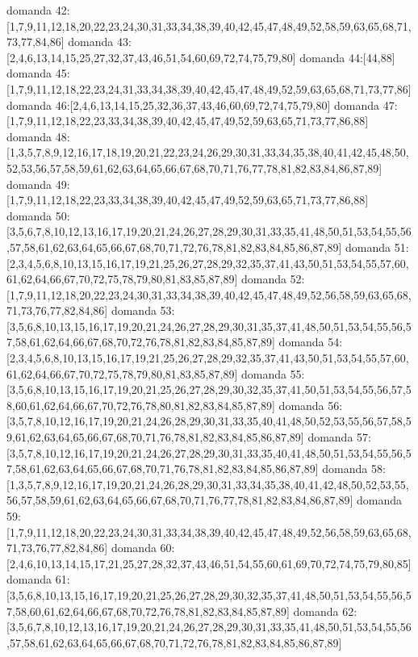domanda 42:[1,7,9,11,12,18,20,22,23,24,30,31,33,34,38,39,40,42,45,47,48,49,52,58,59,63,65,68,71,73,77,84,86]
domanda 43:[2,4,6,13,14,15,25,27,32,37,43,46,51,54,60,69,72,74,75,79,80]
domanda 44:[44,88]
domanda 45:[1,7,9,11,12,18,22,23,24,31,33,34,38,39,40,42,45,47,48,49,52,59,63,65,68,71,73,77,86]
domanda 46:[2,4,6,13,14,15,25,32,36,37,43,46,60,69,72,74,75,79,80]
domanda 47:[1,7,9,11,12,18,22,23,33,34,38,39,40,42,45,47,49,52,59,63,65,71,73,77,86,88]
domanda 48:[1,3,5,7,8,9,12,16,17,18,19,20,21,22,23,24,26,29,30,31,33,34,35,38,40,41,42,45,48,50,52,53,56,57,58,59,61,62,63,64,65,66,67,68,70,71,76,77,78,81,82,83,84,86,87,89]
domanda 49:[1,7,9,11,12,18,22,23,33,34,38,39,40,42,45,47,49,52,59,63,65,71,73,77,86,88]
domanda 50:[3,5,6,7,8,10,12,13,16,17,19,20,21,24,26,27,28,29,30,31,33,35,41,48,50,51,53,54,55,56,57,58,61,62,63,64,65,66,67,68,70,71,72,76,78,81,82,83,84,85,86,87,89]
domanda 51:[2,3,4,5,6,8,10,13,15,16,17,19,21,25,26,27,28,29,32,35,37,41,43,50,51,53,54,55,57,60,61,62,64,66,67,70,72,75,78,79,80,81,83,85,87,89]
domanda 52:[1,7,9,11,12,18,20,22,23,24,30,31,33,34,38,39,40,42,45,47,48,49,52,56,58,59,63,65,68,71,73,76,77,82,84,86]
domanda 53:[3,5,6,8,10,13,15,16,17,19,20,21,24,26,27,28,29,30,31,35,37,41,48,50,51,53,54,55,56,57,58,61,62,64,66,67,68,70,72,76,78,81,82,83,84,85,87,89]
domanda 54:[2,3,4,5,6,8,10,13,15,16,17,19,21,25,26,27,28,29,32,35,37,41,43,50,51,53,54,55,57,60,61,62,64,66,67,70,72,75,78,79,80,81,83,85,87,89]
domanda 55:[3,5,6,8,10,13,15,16,17,19,20,21,25,26,27,28,29,30,32,35,37,41,50,51,53,54,55,56,57,58,60,61,62,64,66,67,70,72,76,78,80,81,82,83,84,85,87,89]
domanda 56:[3,5,7,8,10,12,16,17,19,20,21,24,26,28,29,30,31,33,35,40,41,48,50,52,53,55,56,57,58,59,61,62,63,64,65,66,67,68,70,71,76,78,81,82,83,84,85,86,87,89]
domanda 57:[3,5,7,8,10,12,16,17,19,20,21,24,26,27,28,29,30,31,33,35,40,41,48,50,51,53,54,55,56,57,58,61,62,63,64,65,66,67,68,70,71,76,78,81,82,83,84,85,86,87,89]
domanda 58:[1,3,5,7,8,9,12,16,17,19,20,21,24,26,28,29,30,31,33,34,35,38,40,41,42,48,50,52,53,55,56,57,58,59,61,62,63,64,65,66,67,68,70,71,76,77,78,81,82,83,84,86,87,89]
domanda 59:[1,7,9,11,12,18,20,22,23,24,30,31,33,34,38,39,40,42,45,47,48,49,52,56,58,59,63,65,68,71,73,76,77,82,84,86]
domanda 60:[2,4,6,10,13,14,15,17,21,25,27,28,32,37,43,46,51,54,55,60,61,69,70,72,74,75,79,80,85]
domanda 61:[3,5,6,8,10,13,15,16,17,19,20,21,25,26,27,28,29,30,32,35,37,41,48,50,51,53,54,55,56,57,58,60,61,62,64,66,67,68,70,72,76,78,81,82,83,84,85,87,89]
domanda 62:[3,5,6,7,8,10,12,13,16,17,19,20,21,24,26,27,28,29,30,31,33,35,41,48,50,51,53,54,55,56,57,58,61,62,63,64,65,66,67,68,70,71,72,76,78,81,82,83,84,85,86,87,89]
